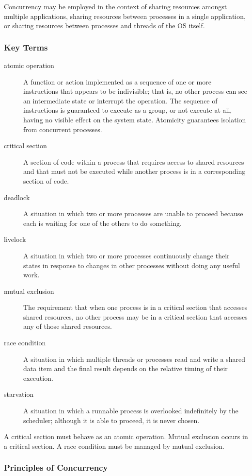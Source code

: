 Concurrency may be employed in the context of sharing resources amongst multiple applications, sharing resources between processes in a single application, or sharing resources between processes and threads of the OS itself.

\subsubsection{Key Terms}

\begin{description}
  \item[atomic operation] A function or action implemented as a sequence of one or more instructions that appears to be indivisible; that is, no other process can see an intermediate state or interrupt the operation.
  The sequence of instructions is guaranteed to execute as a group, or not execute at all, having no visible effect on the system state.
  Atomicity guarantees isolation from concurrent processes.
  \item[critical section] A section of code within a process that requires access to shared resources and that must not be executed while another process is in a corresponding section of code.
  \item[deadlock] A situation in which two or more processes are unable to proceed because each is waiting for one of the others to do something.
  \item[livelock] A situation in which two or more processes continuously change their states in response to changes in other processes without doing any useful work.
  \item[mutual exclusion] The requirement that when one process is in a critical section that accesses shared resources, no other process may be in a critical section that accesses any of those shared resources.
  \item[race condition] A situation in which multiple threads or processes read and write a shared data item and the final result depends on the relative timing of their execution.
  \item[starvation] A situation in which a runnable process is overlooked indefinitely by the scheduler; although it is able to proceed, it is never chosen.
\end{description}

A critical section must behave as an atomic operation.
Mutual exclusion occurs in a critical section.
A race condition must be managed by mutual exclusion.

\subsubsection{Principles of Concurrency}

